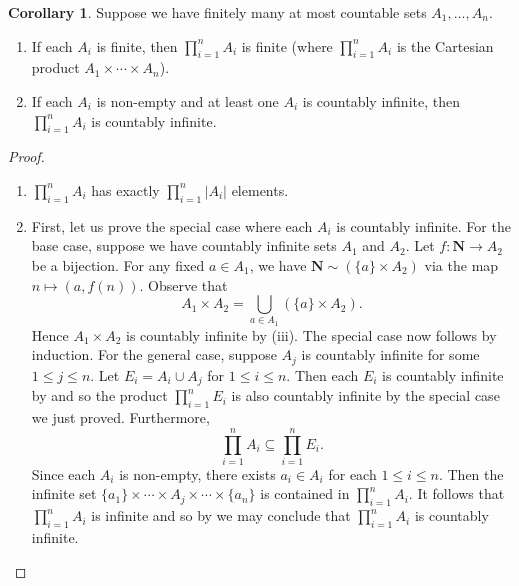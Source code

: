 \documentclass[12pt]{article}
\theoremstyle{definition}
\newtheorem{corollary}[definition]{Corollary}
\newcommand{\N}{\mathbf{N}}
\begin{document}
\begin{corollary}
\label{cor:finite_product_of_amc_sets_is_amc}
    Suppose we have finitely many at most countable sets \( A_1, \ldots, A_n \).
    \begin{enumerate}[label = (\roman*)]
        \item If each \( A_i \) is finite, then \( \prod_{i=1}^n A_i \) is finite (where \( \prod_{i=1}^n A_i \) is the Cartesian product \( A_1 \times \cdots \times A_n \)).

        \item If each \( A_i \) is non-empty and at least one \( A_i \) is countably infinite, then \( \prod_{i=1}^n A_i \) is countably infinite.
    \end{enumerate}
\end{corollary}

\begin{proof}
    \begin{enumerate}[label = (\roman*)]
        \item \( \prod_{i=1}^n A_i \) has exactly \( \prod_{i=1}^n |A_i| \) elements.

        \item First, let us prove the special case where each \( A_i \) is countably infinite. For the base case, suppose we have countably infinite sets \( A_1 \) and \( A_2 \). Let \( f : \N \to A_2 \) be a bijection. For any fixed \( a \in A_1 \), we have \( \N \sim (\{ a \} \times A_2) \) via the map \( n \mapsto (a, f(n)) \). Observe that
        \[
            A_1 \times A_2 = \bigcup_{a \in A_1} (\{ a \} \times A_2).
        \]
        Hence \( A_1 \times A_2 \) is countably infinite by  (iii). The special case now follows by induction. For the general case, suppose \( A_j \) is countably infinite for some \( 1 \leq j \leq n \). Let \( E_i = A_i \cup A_j \) for \( 1 \leq i \leq n \). Then each \( E_i \) is countably infinite by  and so the product \( \prod_{i=1}^n E_i \) is also countably infinite by the special case we just proved. Furthermore,
        \[
            \prod_{i=1}^n A_i \subseteq \prod_{i=1}^n E_i.
        \]
        Since each \( A_i \) is non-empty, there exists \( a_i \in A_i \) for each \( 1 \leq i \leq n \). Then the infinite set \( \{ a_1 \} \times \cdots \times A_j \times \cdots \times \{ a_n \} \) is contained in \( \prod_{i=1}^n A_i \). It follows that \( \prod_{i=1}^n A_i \) is infinite and so by  we may conclude that \( \prod_{i=1}^n A_i \) is countably infinite. \qedhere
    \end{enumerate}
\end{proof}
\end{document}
